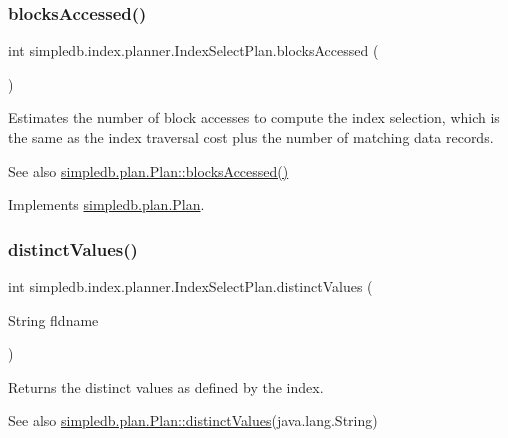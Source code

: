 \subsubsection{\texorpdfstring{blocks\+Accessed()}{blocksAccessed()}}
{\footnotesize\ttfamily int simpledb.\+index.\+planner.\+Index\+Select\+Plan.\+blocks\+Accessed (\begin{DoxyParamCaption}{ }\end{DoxyParamCaption})\hspace{0.3cm}{\ttfamily [inline]}}

Estimates the number of block accesses to compute the index selection, which is the same as the index traversal cost plus the number of matching data records. \begin{DoxySeeAlso}{See also}
\hyperlink{interfacesimpledb_1_1plan_1_1Plan_a6a333b95b956fe224812155b9d1c8202}{simpledb.\+plan.\+Plan\+::blocks\+Accessed()} 
\end{DoxySeeAlso}


Implements \hyperlink{interfacesimpledb_1_1plan_1_1Plan_a6a333b95b956fe224812155b9d1c8202}{simpledb.\+plan.\+Plan}.

\mbox{\label{classsimpledb_1_1index_1_1planner_1_1IndexSelectPlan_a7552fbdecccb53183ce575051cdb93a1}} 
\subsubsection{\texorpdfstring{distinct\+Values()}{distinctValues()}}
{\footnotesize\ttfamily int simpledb.\+index.\+planner.\+Index\+Select\+Plan.\+distinct\+Values (\begin{DoxyParamCaption}\item[{String}]{fldname }\end{DoxyParamCaption})\hspace{0.3cm}{\ttfamily [inline]}}

Returns the distinct values as defined by the index. \begin{DoxySeeAlso}{See also}
\hyperlink{interfacesimpledb_1_1plan_1_1Plan_a55094c16c756b0c09b5c71b94d573271}{simpledb.\+plan.\+Plan\+::distinct\+Values}(java.\+lang.\+String) 
\end{DoxySeeAlso}


